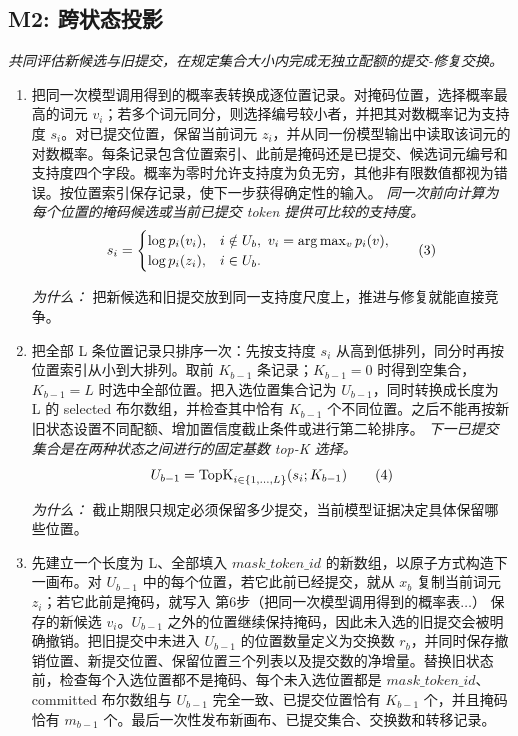 \documentclass[10pt,a4paper]{article}
\begin{document}
\subsection*{M2: 跨状态投影}
\emph{共同评估新候选与旧提交，在规定集合大小内完成无独立配额的提交-修复交换。}
\begin{enumerate}[leftmargin=*,start=6]
  \item 把同一次模型调用得到的概率表转换成逐位置记录。对掩码位置，选择概率最高的词元 \(v_{i}\)；若多个词元同分，则选择编号较小者，并把其对数概率记为支持度 \(s_{i}\)。对已提交位置，保留当前词元 \(z_{i}\)，并从同一份模型输出中读取该词元的对数概率。每条记录包含位置索引、此前是掩码还是已提交、候选词元编号和支持度四个字段。概率为零时允许支持度为负无穷，其他非有限数值都视为错误。按位置索引保存记录，使下一步获得确定性的输入。
\noindent\emph{同一次前向计算为每个位置的掩码候选或当前已提交 token 提供可比较的支持度。}
\begin{equation}
\resizebox{\ifdim\width>\linewidth \linewidth\else\width\fi}{!}{$\displaystyle s_i=\begin{cases}\log p_i(v_i), & i\notin U_b,\ v_i=\arg\max_v p_i(v),\\ \log p_i(z_i), & i\in U_b.\end{cases}$} \tag{3}
\end{equation}
\par\emph{为什么：} 把新候选和旧提交放到同一支持度尺度上，推进与修复就能直接竞争。
  \item 把全部 L 条位置记录只排序一次：先按支持度 \(s_{i}\) 从高到低排列，同分时再按位置索引从小到大排列。取前 \(K_{b-1}\) 条记录；\(K_{b-1}=0\) 时得到空集合，\(K_{b-1}=L\) 时选中全部位置。把入选位置集合记为 \(U_{b-1}\)，同时转换成长度为 L 的 selected 布尔数组，并检查其中恰有 \(K_{b-1}\) 个不同位置。之后不能再按新旧状态设置不同配额、增加置信度截止条件或进行第二轮排序。
\noindent\emph{下一已提交集合是在两种状态之间进行的固定基数 top-K 选择。}
\begin{equation}
\resizebox{\ifdim\width>\linewidth \linewidth\else\width\fi}{!}{$\displaystyle U_{b-1}=\operatorname{TopK}_{i\in\{1,\ldots,L\}}(s_i;K_{b-1})$} \tag{4}
\end{equation}
\par\emph{为什么：} 截止期限只规定必须保留多少提交，当前模型证据决定具体保留哪些位置。
  \item 先建立一个长度为 L、全部填入 \(\mathit{mask\_token\_id}\) 的新数组，以原子方式构造下一画布。对 \(U_{b-1}\) 中的每个位置，若它此前已经提交，就从 \(x_{b}\) 复制当前词元 \(z_{i}\)；若它此前是掩码，就写入 第6步（把同一次模型调用得到的概率表\(\dots \)） 保存的新候选 \(v_{i}\)。\(U_{b-1}\) 之外的位置继续保持掩码，因此未入选的旧提交会被明确撤销。把旧提交中未进入 \(U_{b-1}\) 的位置数量定义为交换数 \(r_{b}\)，并同时保存撤销位置、新提交位置、保留位置三个列表以及提交数的净增量。替换旧状态前，检查每个入选位置都不是掩码、每个未入选位置都是 \(\mathit{mask\_token\_id}\)、committed 布尔数组与 \(U_{b-1}\) 完全一致、已提交位置恰有 \(K_{b-1}\) 个，并且掩码恰有 \(m_{b-1}\) 个。最后一次性发布新画布、已提交集合、交换数和转移记录。

\end{enumerate}
\end{document}
